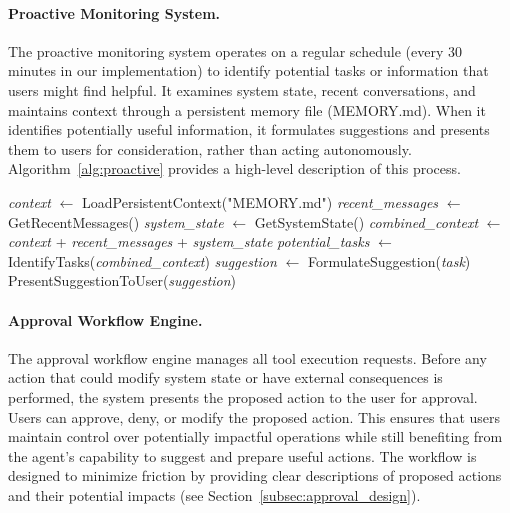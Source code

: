 \documentclass[letterpaper,10pt]{article}
\begin{document}
\paragraph{Proactive Monitoring System.}
The proactive monitoring system operates on a regular schedule (every 30 minutes in our implementation) to identify potential tasks or information that users might find helpful. It examines system state, recent conversations, and maintains context through a persistent memory file (MEMORY.md). When it identifies potentially useful information, it formulates suggestions and presents them to users for consideration, rather than acting autonomously. Algorithm~\ref{alg:proactive} provides a high-level description of this process.

\begin{algorithm}
\caption{Proactive Monitoring Process}
\label{alg:proactive}
\begin{algorithmic}[1]
    \State \textit{context} $\gets$ LoadPersistentContext("MEMORY.md")
    \State \textit{recent\_messages} $\gets$ GetRecentMessages()
    \State \textit{system\_state} $\gets$ GetSystemState()
    \State \textit{combined\_context} $\gets$ \textit{context} + \textit{recent\_messages} + \textit{system\_state}
    \State \textit{potential\_tasks} $\gets$ IdentifyTasks(\textit{combined\_context})
        \State \textit{suggestion} $\gets$ FormulateSuggestion(\textit{task})
        \State PresentSuggestionToUser(\textit{suggestion})
    \EndFor
\EndProcedure
\end{algorithmic}
\end{algorithm}

\paragraph{Approval Workflow Engine.}
The approval workflow engine manages all tool execution requests. Before any action that could modify system state or have external consequences is performed, the system presents the proposed action to the user for approval. Users can approve, deny, or modify the proposed action. This ensures that users maintain control over potentially impactful operations while still benefiting from the agent's capability to suggest and prepare useful actions. The workflow is designed to minimize friction by providing clear descriptions of proposed actions and their potential impacts (see Section~\ref{subsec:approval_design}).
\end{document}
